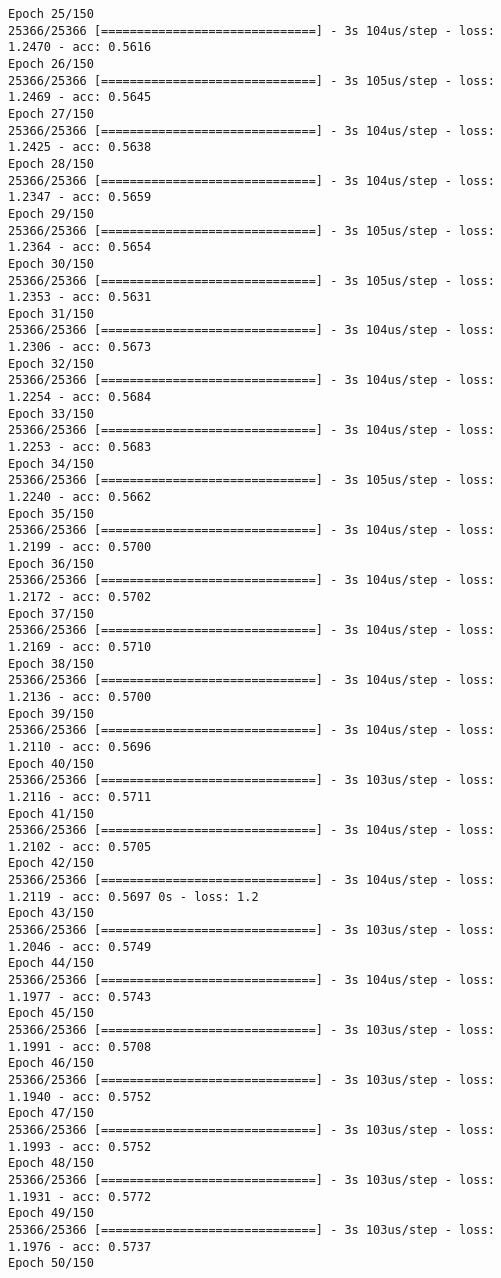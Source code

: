 \documentclass[11pt]{article}
\begin{document}
\begin{Verbatim}[commandchars=\\\{\}]
Epoch 25/150
25366/25366 [==============================] - 3s 104us/step - loss: 1.2470 - acc: 0.5616
Epoch 26/150
25366/25366 [==============================] - 3s 105us/step - loss: 1.2469 - acc: 0.5645
Epoch 27/150
25366/25366 [==============================] - 3s 104us/step - loss: 1.2425 - acc: 0.5638
Epoch 28/150
25366/25366 [==============================] - 3s 104us/step - loss: 1.2347 - acc: 0.5659
Epoch 29/150
25366/25366 [==============================] - 3s 105us/step - loss: 1.2364 - acc: 0.5654
Epoch 30/150
25366/25366 [==============================] - 3s 105us/step - loss: 1.2353 - acc: 0.5631
Epoch 31/150
25366/25366 [==============================] - 3s 104us/step - loss: 1.2306 - acc: 0.5673
Epoch 32/150
25366/25366 [==============================] - 3s 104us/step - loss: 1.2254 - acc: 0.5684
Epoch 33/150
25366/25366 [==============================] - 3s 104us/step - loss: 1.2253 - acc: 0.5683
Epoch 34/150
25366/25366 [==============================] - 3s 105us/step - loss: 1.2240 - acc: 0.5662
Epoch 35/150
25366/25366 [==============================] - 3s 104us/step - loss: 1.2199 - acc: 0.5700
Epoch 36/150
25366/25366 [==============================] - 3s 104us/step - loss: 1.2172 - acc: 0.5702
Epoch 37/150
25366/25366 [==============================] - 3s 104us/step - loss: 1.2169 - acc: 0.5710
Epoch 38/150
25366/25366 [==============================] - 3s 104us/step - loss: 1.2136 - acc: 0.5700
Epoch 39/150
25366/25366 [==============================] - 3s 104us/step - loss: 1.2110 - acc: 0.5696
Epoch 40/150
25366/25366 [==============================] - 3s 103us/step - loss: 1.2116 - acc: 0.5711
Epoch 41/150
25366/25366 [==============================] - 3s 104us/step - loss: 1.2102 - acc: 0.5705
Epoch 42/150
25366/25366 [==============================] - 3s 104us/step - loss: 1.2119 - acc: 0.5697 0s - loss: 1.2
Epoch 43/150
25366/25366 [==============================] - 3s 103us/step - loss: 1.2046 - acc: 0.5749
Epoch 44/150
25366/25366 [==============================] - 3s 104us/step - loss: 1.1977 - acc: 0.5743
Epoch 45/150
25366/25366 [==============================] - 3s 103us/step - loss: 1.1991 - acc: 0.5708
Epoch 46/150
25366/25366 [==============================] - 3s 103us/step - loss: 1.1940 - acc: 0.5752
Epoch 47/150
25366/25366 [==============================] - 3s 103us/step - loss: 1.1993 - acc: 0.5752
Epoch 48/150
25366/25366 [==============================] - 3s 103us/step - loss: 1.1931 - acc: 0.5772
Epoch 49/150
25366/25366 [==============================] - 3s 103us/step - loss: 1.1976 - acc: 0.5737
Epoch 50/150

\end{Verbatim}
\end{document}
